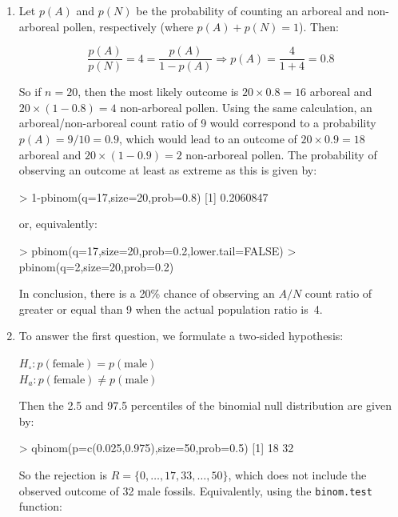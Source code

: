 \begin{enumerate}

\item Let $p(A)$ and $p(N)$ be the probability of counting an arboreal
  and non-arboreal pollen, respectively (where $p(A)+p(N)=1$). Then:

  \[
  \frac{p(A)}{p(N)} = 4 = \frac{p(A)}{1-p(A)}
  \Rightarrow p(A) = \frac{4}{1+4} = 0.8
  \]

  So if $n=20$, then the most likely outcome is $20\times{0.8}=16$
  arboreal and $20\times{(1-0.8)}=4$ non-arboreal pollen. Using the
  same calculation, an arboreal/non-arboreal count ratio of 9 would
  correspond to a probability $p(A)=9/10=0.9$, which would lead to an
  outcome of $20\times{0.9}=18$ arboreal and $20\times{(1-0.9)}=2$
  non-arboreal pollen. The probability of observing an outcome at
  least as extreme as this is given by:

\begin{console}
> 1-pbinom(q=17,size=20,prob=0.8)
[1] 0.2060847
\end{console}

or, equivalently:

\begin{console}
> pbinom(q=17,size=20,prob=0.2,lower.tail=FALSE)
> pbinom(q=2,size=20,prob=0.2)
\end{console}

In conclusion, there is a 20\% chance of observing an $A/N$ count
ratio of greater or equal than 9 when the actual population ratio
is~4.
  
\item To answer the first question, we formulate a two-sided
  hypothesis:

  $H_\circ: p(\mbox{female}) = p(\mbox{male})$\\
  $H_a: p(\mbox{female}) \neq p(\mbox{male})$

  Then the 2.5 and 97.5 percentiles of the binomial null distribution
  are given by:

\begin{console}
> qbinom(p=c(0.025,0.975),size=50,prob=0.5)
[1] 18 32
\end{console}

So the rejection is $R=\{0,\ldots,17,33,\ldots,50\}$, which does not
include the observed outcome of 32 male fossils. Equivalently, using
the \texttt{binom.test} function:
  


\end{enumerate}
